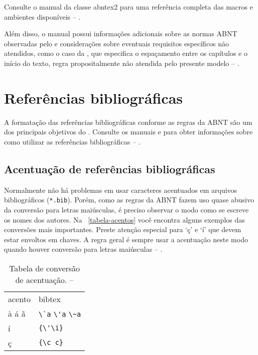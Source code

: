 Consulte o manual da classe \textsf{abntex2} \cite{abntex2classe} para uma
referência completa das macros e ambientes disponíveis -- \showfont.

Além disso, o manual possui informações adicionais sobre as normas ABNT
observadas pelo \abnTeX{} e considerações sobre eventuais requisitos específicos
não atendidos, como o caso da \textcite[seção 5.2.2]{NBR14724:2011}, que
especifica o espaçamento entre os capítulos e o início do texto, regra
propositalmente não atendida pelo presente modelo -- \showfont.



\section{Referências bibliográficas}

A formatação das referências bibliográficas conforme as regras da ABNT são um
dos principais objetivos do \abnTeX{}. Consulte os manuais
\textcite{abntex2cite} e \textcite{abntex2cite-alf} para obter informações
sobre como utilizar as referências bibliográficas -- \showfont.



\subsection{Acentuação de referências bibliográficas}

Normalmente não há problemas em usar caracteres acentuados em arquivos
bibliográficos (\texttt{*.bib}). Porém, como as regras da ABNT fazem uso quase
abusivo da conversão para letras maiúsculas, é preciso observar o modo como se
escreve os nomes dos autores. Na ~\autoref{tabela-acentos} você encontra alguns
exemplos das conversões mais importantes. Preste atenção especial para `ç' e `í'
que devem estar envoltos em chaves. A regra geral é sempre usar a acentuação
neste modo quando houver conversão para letras maiúsculas -- \showfont.

\begin{table}[htbp]
    \caption[Tabela de conversão de acentuação]{Tabela de conversão de acentuação. -- \showfont}
    \label{tabela-acentos}
    \centering
    \begin{tabular}{ll}\hline\hline
        acento & \textsf{bibtex}                  \\
        à á ã  & \verb+\`a+ \verb+\'a+ \verb+\~a+ \\
        í      & \verb+{\'\i}+                    \\
        ç      & \verb+{\c c}+                    \\
        \hline\hline
    \end{tabular}
\end{table}



